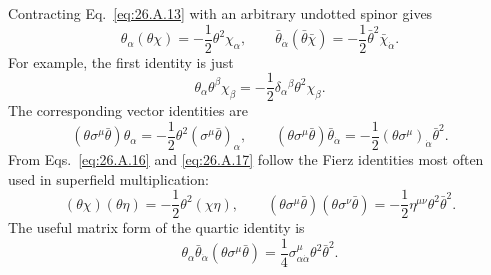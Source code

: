Contracting Eq.~\eqref{eq:26.A.13} with an arbitrary undotted spinor gives
\begin{equation}
  \theta_\alpha(\theta\chi)
  =-\frac12\theta^2\chi_\alpha,
  \qquad
  \bar\theta_{\dot\alpha}(\bar\theta\bar\chi)
  =-\frac12\bar\theta^2\bar\chi_{\dot\alpha}.
  \tag{26.A.16}\label{eq:26.A.16}
\end{equation}
For example, the first identity is just
\[
  \theta_\alpha\theta^\beta\chi_\beta
  =-\frac12\delta_\alpha{}^\beta\theta^2\chi_\beta .
\]
The corresponding vector identities are
\begin{equation}
  (\theta\sigma^\mu\bar\theta)\theta_\alpha
  =-\frac12\theta^2(\sigma^\mu\bar\theta)_\alpha,
  \qquad
  (\theta\sigma^\mu\bar\theta)\bar\theta_{\dot\alpha}
  =-\frac12(\theta\sigma^\mu)_{\dot\alpha}\bar\theta^2 .
  \tag{26.A.17}\label{eq:26.A.17}
\end{equation}
From Eqs.~\eqref{eq:26.A.16} and \eqref{eq:26.A.17} follow the Fierz
identities most often used in superfield multiplication:
\begin{equation}
  (\theta\chi)(\theta\eta)
  =-\frac12\theta^2(\chi\eta),
  \qquad
  (\theta\sigma^\mu\bar\theta)
  (\theta\sigma^\nu\bar\theta)
  =-\frac12\eta^{\mu\nu}\theta^2\bar\theta^2 .
  \tag{26.A.18}\label{eq:26.A.18}
\end{equation}
The useful matrix form of the quartic identity is
\begin{equation}
  \theta_\alpha\bar\theta_{\dot\alpha}
  (\theta\sigma^\mu\bar\theta)
  =\frac14\sigma^\mu_{\alpha\dot\alpha}
    \theta^2\bar\theta^2 .
  \tag{26.A.19}\label{eq:26.A.19}
\end{equation}

